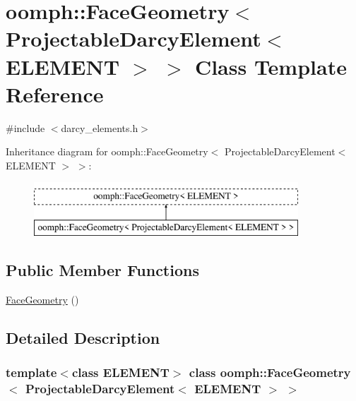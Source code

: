 \hypertarget{classoomph_1_1FaceGeometry_3_01ProjectableDarcyElement_3_01ELEMENT_01_4_01_4}{}\section{oomph\+:\+:Face\+Geometry$<$ Projectable\+Darcy\+Element$<$ E\+L\+E\+M\+E\+NT $>$ $>$ Class Template Reference}
\label{classoomph_1_1FaceGeometry_3_01ProjectableDarcyElement_3_01ELEMENT_01_4_01_4}


{\ttfamily \#include $<$darcy\+\_\+elements.\+h$>$}

Inheritance diagram for oomph\+:\+:Face\+Geometry$<$ Projectable\+Darcy\+Element$<$ E\+L\+E\+M\+E\+NT $>$ $>$\+:\begin{figure}[H]
\begin{center}
\leavevmode
\includegraphics[height=2.000000cm]{classoomph_1_1FaceGeometry_3_01ProjectableDarcyElement_3_01ELEMENT_01_4_01_4}
\end{center}
\end{figure}
\subsection*{Public Member Functions}
\begin{DoxyCompactItemize}
\item 
\hyperlink{classoomph_1_1FaceGeometry_3_01ProjectableDarcyElement_3_01ELEMENT_01_4_01_4_a4bc15807a2a26faba2f115a1e98a845a}{Face\+Geometry} ()
\end{DoxyCompactItemize}


\subsection{Detailed Description}
\subsubsection*{template$<$class E\+L\+E\+M\+E\+NT$>$\newline
class oomph\+::\+Face\+Geometry$<$ Projectable\+Darcy\+Element$<$ E\+L\+E\+M\+E\+N\+T $>$ $>$}

